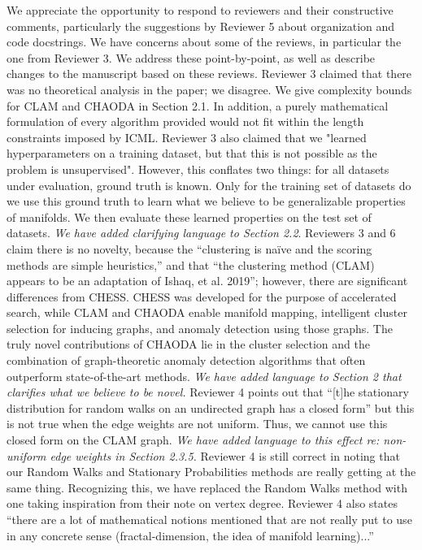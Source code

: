\documentclass{article}
\begin{document}
\onecolumn
We appreciate the opportunity to respond to reviewers and their constructive comments, particularly the suggestions by Reviewer 5 about organization and code docstrings.
We have concerns about some of the reviews, in particular the one from Reviewer 3.
We address these point-by-point, as well as describe changes to the manuscript based on these reviews.
Reviewer 3 claimed that there was no theoretical analysis in the paper; we disagree.
We give complexity bounds for CLAM and CHAODA in Section 2.1.
In addition, a purely mathematical formulation of every algorithm provided would not fit within the length constraints imposed by ICML.
Reviewer 3 also claimed that we "learned hyperparameters on a training dataset, but that this is not possible as the problem is unsupervised".
However, this conflates two things: for all datasets under evaluation, ground truth is known.
Only for the training set of datasets do we use this ground truth to learn what we believe to be generalizable properties of manifolds.
We then evaluate these learned properties on the test set of datasets.
\emph{We have added clarifying language to Section 2.2}.
Reviewers 3 and 6 claim there is no novelty, because the ``clustering is na\"ive and the scoring methods are simple heuristics,'' and that ``the clustering method (CLAM) appears to be an adaptation of Ishaq, et al. 2019'';
however, there are significant differences from CHESS.
CHESS was developed for the purpose of accelerated search, while CLAM and CHAODA enable manifold mapping, intelligent cluster selection for inducing graphs, and anomaly detection using those graphs.
The truly novel contributions of CHAODA lie in the cluster selection and the combination of graph-theoretic anomaly detection algorithms that often outperform state-of-the-art methods.
\emph{We have added language to Section 2 that clarifies what we believe to be novel.}
Reviewer 4 points out that ``[t]he stationary distribution for random walks on an undirected graph has a closed form'' but this is not true when the edge weights are not uniform.
Thus, we cannot use this closed form on the CLAM graph.
\emph{We have added language to this effect re: non-uniform edge weights in Section 2.3.5.}
Reviewer 4 is still correct in noting that our Random Walks and Stationary Probabilities methods are really getting at the same thing.
Recognizing this, we have replaced the Random Walks method with one taking inspiration from their note on vertex degree.
Reviewer 4 also states ``there are a lot of mathematical notions mentioned that are not really put to use in any concrete sense (fractal-dimension, the idea of manifold learning)...''
\end{document}
